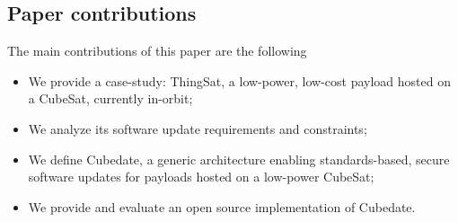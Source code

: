 \subsection*{Paper contributions}
The main contributions of this paper are the following
\begin{itemize}
    \item We provide a case-study: ThingSat, a low-power, low-cost payload hosted on a CubeSat, currently in-orbit;
    \item We analyze its software update requirements and constraints;
    \item We define Cubedate, a generic architecture enabling standards-based, secure software updates for payloads hosted on a low-power CubeSat;
    \item We provide and evaluate an open source implementation of Cubedate.
\end{itemize}

